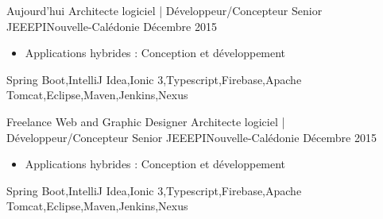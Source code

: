 %
%


\begin{experiences}
  \experience
    {Aujourd'hui}   {Architecte logiciel | Développeur/Concepteur Senior JEE}{EPI}{Nouvelle-Calédonie}
    {Décembre 2015} {
                      \begin{itemize}
                        \item Applications hybrides : Conception et développement
                      \end{itemize}
                    }
                    {Spring Boot,IntelliJ Idea,Ionic 3,Typescript,Firebase,Apache Tomcat,Eclipse,Maven,Jenkins,Nexus}
  \emptySeparator

  \experience
  {Freelance Web and Graphic Designer }   {Architecte logiciel | Développeur/Concepteur Senior JEE}{EPI}{Nouvelle-Calédonie}
  {Décembre 2015} {
                    \begin{itemize}
                      \item Applications hybrides : Conception et développement
                    \end{itemize}
                  }
                  {Spring Boot,IntelliJ Idea,Ionic 3,Typescript,Firebase,Apache Tomcat,Eclipse,Maven,Jenkins,Nexus}
\end{experiences}
